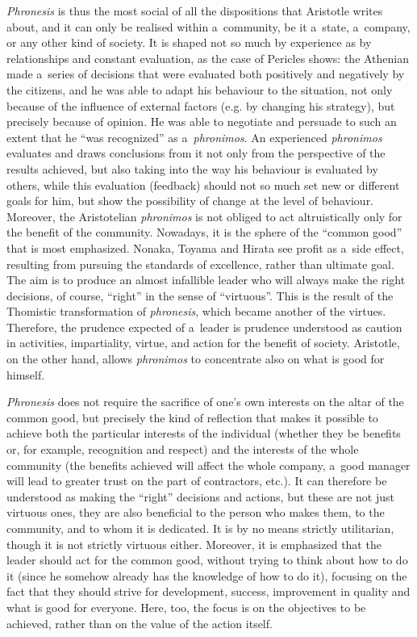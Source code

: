 \textit{Phronesis} is thus the most social of all the dispositions that Aristotle writes about, and it can only be realised within a~community, be it a~state, a~company, or any other kind of society. It is shaped not so much by experience as by relationships and constant evaluation, as the case of Pericles shows: the Athenian made a~series of decisions that were evaluated both positively and negatively by the citizens, and he was able to adapt his behaviour to the situation, not only because of the influence of external factors (e.g. by changing his strategy), but precisely because of opinion. He was able to negotiate and persuade to such an extent that he ``was recognized'' as a~\textit{phronimos}. An experienced \textit{phronimos} evaluates and draws conclusions from it not only from the perspective of the results achieved, but also taking into the way his behaviour is evaluated by others, while this evaluation (feedback) should not so much set new or different goals for him, but show the possibility of change at the level of behaviour. Moreover, the Aristotelian \textit{phronimos} is not obliged to act altruistically only for the benefit of the community. Nowadays, it is the sphere of the ``common good'' that is most emphasized. Nonaka, Toyama and Hirata see profit as a~side effect, resulting from pursuing the standards of excellence, rather than ultimate goal. The aim is to produce an almost infallible leader who will always make the right decisions, of course, ``right'' in the sense of ``virtuous''. This is the result of the Thomistic transformation of \textit{phronesis}, which became another of the virtues. Therefore, the prudence expected of a~leader is prudence understood as caution in activities, impartiality, virtue, and action for the benefit of society. Aristotle, on the other hand, allows \textit{phronimos} to concentrate also on what is good for himself.



\textit{Phronesis} does not require the sacrifice of one's own interests on the altar of the common good, but precisely the kind of reflection that makes it possible to achieve both the particular interests of the individual (whether they be benefits or, for example, recognition and respect) and the interests of the whole community (the benefits achieved will affect the whole company, a~good manager will lead to greater trust on the part of contractors, etc.). It can therefore be understood as making the ``right'' decisions and actions, but these are not just virtuous ones, they are also beneficial to the person who makes them, to the community, and to whom it is dedicated. It is by no means strictly utilitarian, though it is not strictly virtuous either. Moreover, it is emphasized that the leader should act for the common good, without trying to think about how to do it (since he somehow already has the knowledge of how to do it), focusing on the fact that they should strive for development, success, improvement in quality and what is good for everyone. Here, too, the focus is on the objectives to be achieved, rather than on the value of the action itself.



